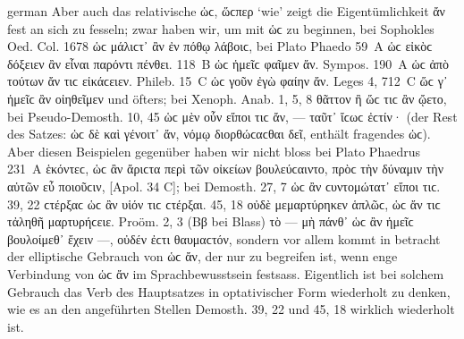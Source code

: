 \begin{otherlanguage*}{german}
Aber auch das relativische ὡϲ, ὥϲπερ ‘wie’ zeigt die Eigentümlichkeit ἄν fest an sich zu fesseln; zwar haben wir, um mit ὡϲ zu beginnen, bei Sophokles Oed. Col. 1678 ὡϲ μάλιϲτ᾽ ἂν ἐν πόθῳ λάβοιϲ, bei Plato Phaedo 59~A ὡϲ εἰκὸϲ δόξειεν ἂν εἶναι παρόντι πένθει. 118~Β ὡϲ ἡμεῖϲ φαῖμεν ἄν. Sympos. 190~Α ὡϲ ἀπὸ τούτων ἄν τιϲ εἰκάϲειεν. Phileb. 15~C ὡϲ γοῦν ἐγὼ φαίην ἄν. Leges 4, 712~C ὥϲ γ᾽ ἡμεῖϲ ἂν οἰηθεῖμεν und öfters; bei Xenoph. Anab. 1, 5, 8 θᾶττον ἢ ὥϲ τιϲ ἂν ᾤετο, bei Pseudo-Demosth. 10, 45 ὡϲ μὲν οὖν εἴποι τιϲ ἄν, — ταῦτ᾽ ἴϲωϲ ἐϲτίν· (der Rest des Satzes: ὡϲ δὲ καὶ γένοιτ᾽ ἄν, νόμῳ διορθώϲαϲθαι δεῖ, enthält fragendes ὡϲ). Aber diesen Beispielen gegenüber haben wir nicht bloss bei Plato Phaedrus 231~A ἑκόντεϲ, ὡϲ ἂν ἄριϲτα περὶ τῶν οἰκείων βουλεύϲαιντο, πρὸϲ τὴν δύναμιν τὴν αὑτῶν εὖ ποιοῦϲιν, [Apol. 34 C]; bei Demosth. 27, 7 ὡϲ ἂν ϲυντομώτατ᾽ εἴποι τιϲ. 39, 22 ϲτέρξαϲ ὡϲ ἂν υἱόν τιϲ ϲτέρξαι. 45, 18 οὐδὲ μεμαρτύρηκεν ἁπλῶϲ, ὡϲ ἄν τιϲ τἀληθῆ μαρτυρήϲειε. Proöm. 2, 3 (Ββ bei Blass) τὸ — μὴ πάνθ᾽ ὡϲ ἂν ἡμεῖϲ βουλοίμεθ᾽ ἔχειν —, οὐδέν ἐϲτι θαυμαϲτόν, sondern vor allem kommt in betracht der elliptische Gebrauch von ὡϲ ἄν, der nur zu begreifen ist, wenn enge Verbindung von ὡϲ ἄν im Sprachbewusstsein festsass. Eigentlich ist bei solchem Gebrauch das Verb des Hauptsatzes in optativischer Form wiederholt zu denken, wie es an den angeführten Stellen Demosth. 39, 22 und 45, 18 wirklich wiederholt ist.


\end{otherlanguage*}
